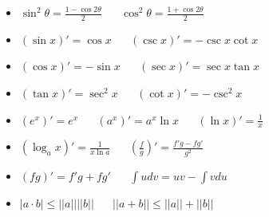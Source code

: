 \documentclass{article}
\begin{document}
\begin{multicols*}{4}
\begin{itemize}
    \item $\sin^2 \theta = \frac{1-\cos 2\theta}{2}$ $\quad$ $\cos^2 \theta = \frac{1+\cos 2\theta}{2}$
    \item $(\sin x)' = \cos x$ $\quad$ $(\csc x)' = -\csc x \cot x$
    \item $(\cos x)' = -\sin x$ $\quad$ $(\sec x)' = \sec x \tan x$
    \item $(\tan x)' = \sec^2 x$ $\quad$ $(\cot x)' = -\csc^2 x$
    \item $(e^x)' = e^x$ $\quad$ $(a^x)' = a^x \ln x$ $\quad$ $(\ln x)' = \frac{1}{x}$
    \item $(\log_a x)' = \frac{1}{x \ln a}$ $\quad$ $(\frac{f}{g})' = \frac{f'g -fg'}{g^2}$ 
    \item $(fg)' = f'g+fg'$ $\quad$ $\int udv = uv - \int vdu$
    \item $|a \cdot b| \leq ||a||||b||$ $\quad$ $||a+b|| \leq ||a|| + ||b||$
\end{itemize}

\end{multicols*}
\end{document}
